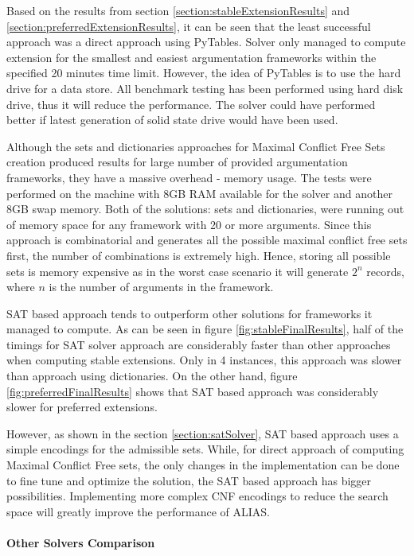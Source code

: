 Based on the results from section \ref{section:stableExtensionResults} and \ref{section:preferredExtensionResults}, it can be seen that the least successful approach was a direct approach using PyTables. Solver only managed to compute extension for the smallest and easiest argumentation frameworks within the specified 20 minutes time limit. However, the idea of PyTables is to use the hard drive for a data store. All benchmark testing has been performed using hard disk drive, thus it will reduce the performance. The solver could have performed better if latest generation of solid state drive would have been used. 

Although the sets and dictionaries approaches for Maximal Conflict Free Sets creation produced results for large number of provided argumentation frameworks, they have a massive overhead - memory usage. The tests were performed on the machine with 8GB RAM available for the solver and another 8GB swap memory. Both of the solutions: sets and dictionaries, were running out of memory space for any framework with 20 or more arguments. Since this approach is combinatorial and  generates all the possible maximal conflict free sets first, the number of combinations is extremely high. Hence, storing all possible sets is memory expensive as in the worst case scenario it will generate $2^n$ records, where $n$ is the number of arguments in the framework.

SAT based approach tends to outperform other solutions for frameworks it managed to compute. As can be seen in figure \ref{fig:stableFinalResults}, half of the timings for SAT solver approach are considerably faster than other approaches when computing stable extensions. Only in 4 instances, this approach was slower than approach using dictionaries. On the other hand, figure \ref{fig:preferredFinalResults} shows that SAT based approach was considerably slower for preferred extensions. 

However, as shown in the section \ref{section:satSolver}, SAT based approach uses a simple encodings for the admissible sets. While, for direct approach of computing Maximal Conflict Free sets, the only changes in the implementation can be done to fine tune and optimize the solution, the SAT based approach has bigger possibilities. Implementing more complex CNF encodings to reduce the search space will greatly improve the performance of ALIAS.

\paragraph{Other Solvers Comparison}



